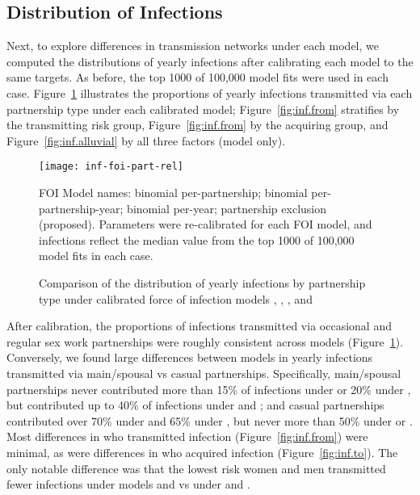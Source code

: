 \subsection{Distribution of Infections}\label{exp.inf}
Next, to explore differences in transmission networks under each model,
we computed the distributions of yearly infections
after calibrating each model to the same targets.
As before, the top 1000 of 100,000 model fits were used in each case.
Figure~\ref{fig:inf.part} illustrates the proportions of yearly infections
transmitted via each partnership type under each calibrated model;
Figure~\ref{fig:inf.from} stratifies by the transmitting risk group,
Figure~\ref{fig:inf.from} by the acquiring group, and
Figure~\ref{fig:inf.alluvial} by all three factors (model  only).
\begin{figure}[h]
  \centerline{\texttt{[image: inf-foi-part-rel]}}
  \caption{Comparison of the distribution of yearly infections by partnership type
    under calibrated force of infection models , , , and }
  \label{fig:inf.part}
  \floatfoot
  FOI Model names:
   binomial per-partnership;
   binomial per-partnership-year;
   binomial per-year;
   partnership exclusion (proposed).
  Parameters were re-calibrated for each FOI model,
  and infections reflect the median value from
  the top 1000 of 100,000 model fits in each case.
\end{figure}
\par
After calibration, the proportions of infections transmitted
via occasional and regular sex work partnerships were roughly consistent across models
(Figure~\ref{fig:inf.part}).
Conversely, we found large differences between models in yearly infections transmitted
via main/spousal vs casual partnerships.
Specifically, main/spousal partnerships
never contributed more than 15\% of infections under  or 20\% under ,
but contributed up to 40\% of infections under  and ;
and casual partnerships contributed over 70\% under  and 65\% under ,
but never more than 50\% under  or .
Most differences in who transmitted infection (Figure~\ref{fig:inf.from}) were minimal,
as were differences in who acquired infection (Figure~\ref{fig:inf.to}).
The only notable difference was that the lowest risk women and men
transmitted fewer infections under models  and  vs under  and .
